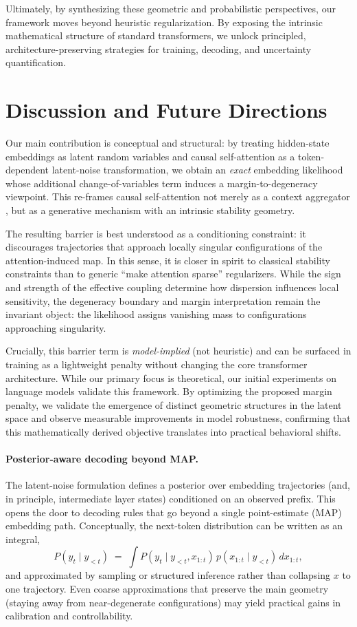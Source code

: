 \documentclass[11pt]{article}
\begin{document}
Ultimately, by synthesizing these geometric and probabilistic perspectives, our framework moves beyond heuristic regularization. By exposing the intrinsic mathematical structure of standard transformers, we unlock principled, architecture-preserving strategies for training, decoding, and uncertainty quantification.

\section{Discussion and Future Directions}
\label{sec:discussion}

Our main contribution is conceptual and structural: by treating hidden-state embeddings as latent random variables and causal self-attention as a token-dependent latent-noise transformation, we obtain an \emph{exact} embedding likelihood whose additional change-of-variables term induces a margin-to-degeneracy viewpoint.
This re-frames causal self-attention not merely as a context aggregator \citep{VaswaniShPaUsJoGoKaPo17}, but as a generative mechanism with an intrinsic stability geometry.

The resulting barrier is best understood as a conditioning constraint: it discourages trajectories that approach locally singular configurations of the attention-induced map.
In this sense, it is closer in spirit to classical stability constraints than to generic ``make attention sparse'' regularizers.
While the sign and strength of the effective coupling determine how dispersion influences local sensitivity, the degeneracy boundary and margin interpretation remain the invariant object: the likelihood assigns vanishing mass to configurations approaching singularity.

Crucially, this barrier term is \emph{model-implied} (not heuristic) and can be surfaced in training as a lightweight penalty without changing the core transformer architecture. 
While our primary focus is theoretical, our initial experiments on language models validate this framework. By optimizing the proposed margin penalty, we validate the emergence of distinct geometric structures in the latent space and observe measurable improvements in model robustness, confirming that this mathematically derived objective translates into practical behavioral shifts.

\paragraph{Posterior-aware decoding beyond MAP.}
The latent-noise formulation defines a posterior over embedding trajectories (and, in principle, intermediate layer states) conditioned on an observed prefix.
This opens the door to decoding rules that go beyond a single point-estimate (MAP) embedding path.
Conceptually, the next-token distribution can be written as an integral,
\[
P(y_t \mid y_{<t}) \;=\; \int P(y_t \mid y_{<t}, x_{1:t})\, p(x_{1:t} \mid y_{<t})\, dx_{1:t},
\]
and approximated by sampling or structured inference rather than collapsing $x$ to one trajectory.
Even coarse approximations that preserve the main geometry (staying away from near-degenerate configurations) may yield practical gains in calibration and controllability.
\end{document}
